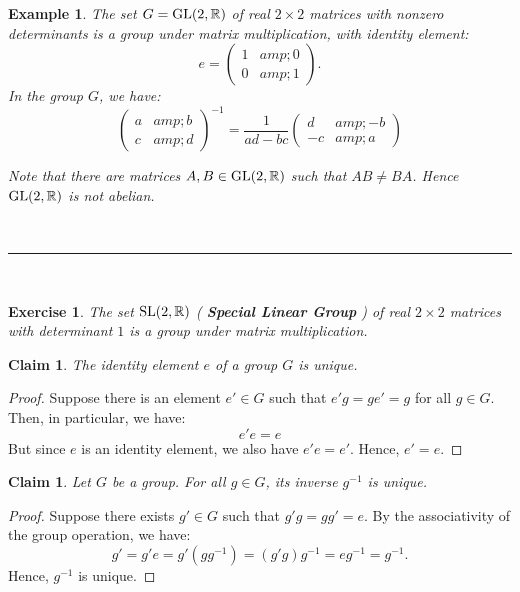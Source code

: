 \documentclass[a4paper,12pt]{report}
\newcounter{statement}
\numberwithin{statement}{chapter}
\newtheorem{claim}[statement]{Claim}
\newtheorem{eg}[statement]{\bf Example}
\newtheorem{ex}[statement]{\bf Exercise}
\numberwithin{equation}{chapter}
\numberwithin{section}{chapter}
\numberwithin{subsection}{section}
\begin{document}
\begin{eg}
The set $G = {\rm GL}(2, \mathbb{R})$
of real $2 \times 2$ matrices with nonzero determinants is a group
under matrix multiplication, with identity element:
\[e = \left(\begin{matrix} 1 &amp; 0\\0&amp; 1\end{matrix}\right).\]
In the group $G$, we have:
\[\left(\begin{matrix} a &amp; b \\ c &amp; d\end{matrix}\right)^{-1}
=
\frac{1}{ad - bc}\left(\begin{matrix}d &amp; -b \\-c &amp; a\end{matrix}\right)\]

Note that there are matrices $A, B \in {\rm GL}(2, \mathbb{R})$
such that $AB \neq BA$. Hence ${\rm GL}(2, \mathbb{R})$ is not abelian.





\quad\\\hrule
\quad\\


\end{eg}
\begin{ex}

The set ${\rm SL}(2, \mathbb{R})$ ( {\bf Special Linear Group} )
of real $2 \times 2$ matrices with determinant $1$ is a group under matrix multiplication.
\end{ex}


\begin{claim}
The identity element $e$ of a group $G$ is unique.
\end{claim}
\begin{proof}

Suppose there is an element $e' \in G$ such that $e' g = ge' = g$ for all $g \in G$.
Then, in particular, we have:
\[e'e = e\]
But since $e$ is an identity element, we also have $e'e = e'$. Hence, $e' = e$.
\end{proof}
\begin{claim}
Let $G$ be a group.
For all $g \in G$, its inverse $g^{-1}$ is unique.
\end{claim}
\begin{proof}

Suppose there exists $g' \in G$ such that $g'g = gg' = e$.
By the associativity of the group operation, we have:
\[g' = g'e = g'(g g^{-1}) = (g'g)g^{-1} = e g^{-1} = g^{-1}.\]
Hence, $g^{-1}$ is unique.
\end{proof}
\end{document}
